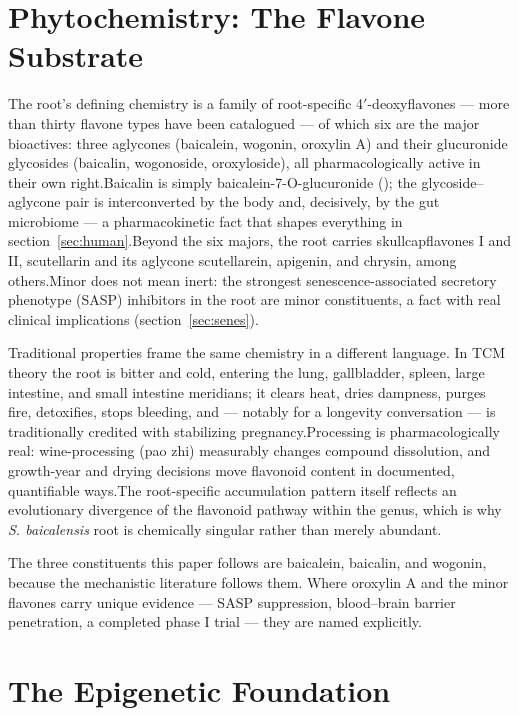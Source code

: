 \documentclass[11pt]{article}
\newcommand{\src}[1]{\allowbreak[#1]}
\begin{document}
\section{Phytochemistry: The Flavone Substrate}
\label{sec:phyto}

The root's defining chemistry is a family of root-specific 4$'$-deoxyflavones --- more than thirty flavone types have been catalogued --- of which six are the major bioactives: three aglycones (baicalein, wogonin, oroxylin A) and their glucuronide glycosides (baicalin, wogonoside, oroxyloside), all pharmacologically active in their own right.\src{88}\src{54} Baicalin is simply baicalein-7-O-glucuronide (); the glycoside--aglycone pair is interconverted by the body and, decisively, by the gut microbiome --- a pharmacokinetic fact that shapes everything in section~\ref{sec:human}.\src{54}\src{234} Beyond the six majors, the root carries skullcapflavones I and II, scutellarin and its aglycone scutellarein, apigenin, and chrysin, among others.\src{99}\src{73} Minor does not mean inert: the strongest senescence-associated secretory phenotype (SASP) inhibitors in the root are minor constituents, a fact with real clinical implications (section~\ref{sec:senes}).\src{211}

Traditional properties frame the same chemistry in a different language. In TCM theory the root is bitter and cold, entering the lung, gallbladder, spleen, large intestine, and small intestine meridians; it clears heat, dries dampness, purges fire, detoxifies, stops bleeding, and --- notably for a longevity conversation --- is traditionally credited with stabilizing pregnancy.\src{79} Processing is pharmacologically real: wine-processing (pao zhi) measurably changes compound dissolution, and growth-year and drying decisions move flavonoid content in documented, quantifiable ways.\src{92}\src{73} The root-specific accumulation pattern itself reflects an evolutionary divergence of the flavonoid pathway within the genus, which is why \textit{S. baicalensis} root is chemically singular rather than merely abundant.\src{75}

The three constituents this paper follows are baicalein, baicalin, and wogonin, because the mechanistic literature follows them. Where oroxylin A and the minor flavones carry unique evidence --- SASP suppression, blood--brain barrier penetration, a completed phase I trial --- they are named explicitly.

\section{The Epigenetic Foundation}
\label{sec:epigen}
\end{document}
